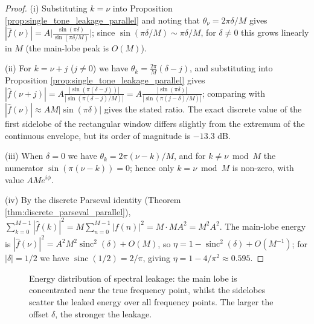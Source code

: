 \begin{proof}
(i) Substituting $k=\nu$ into Proposition \ref{prop:single_tone_leakage_parallel} and noting that $\theta_\nu=2\pi\delta/M$ gives $|\hat f(\nu)|=A\big|\frac{\sin(\pi\delta)}{\sin(\pi\delta/M)}\big|$; since $\sin(\pi\delta/M)\sim\pi\delta/M$, for $\delta\ne0$ this grows linearly in $M$ (the main-lobe peak is $O(M)$).

(ii) For $k=\nu+j$ ($j\ne0$) we have $\theta_k=\frac{2\pi}{M}(\delta-j)$, and substituting into Proposition \ref{prop:single_tone_leakage_parallel} gives $|\hat f(\nu+j)|=A\frac{|\sin(\pi(\delta-j))|}{|\sin(\pi(\delta-j)/M)|}=A\frac{|\sin(\pi\delta)|}{|\sin(\pi(j-\delta)/M)|}$; comparing with $|\hat f(\nu)|\approx AM|\sin(\pi\delta)|$ gives the stated ratio. The exact discrete value of the first sidelobe of the rectangular window differs slightly from the extremum of the continuous envelope, but its order of magnitude is $-13.3$ dB.

(iii) When $\delta=0$ we have $\theta_k=2\pi(\nu-k)/M$, and for $k\ne\nu\bmod M$ the numerator $\sin(\pi(\nu-k))=0$; hence only $k=\nu\bmod M$ is non-zero, with value $AMe^{i\phi}$.

(iv) By the discrete Parseval identity (Theorem \ref{thm:discrete_parseval_parallel}),
$\sum_{k=0}^{M-1}|\hat f(k)|^2=M\sum_{n=0}^{M-1}|f(n)|^2=M\cdot MA^2=M^2A^2$. The main-lobe energy is $|\hat f(\nu)|^2=A^2M^2\operatorname{sinc}^2(\delta)+O(M)$, so $\eta=1-\operatorname{sinc}^2(\delta)+O(M^{-1})$; for $|\delta|=1/2$ we have $\operatorname{sinc}(1/2)=2/\pi$, giving $\eta=1-4/\pi^2\approx0.595$.
\end{proof}

\begin{figure}[htbp]
\centering
{}
\caption{Energy distribution of spectral leakage: the main lobe is concentrated near the true frequency point, whilst the sidelobes scatter the leaked energy over all frequency points. The larger the offset $\delta$, the stronger the leakage.}
\label{fig:spectral_leakage}
\end{figure}


